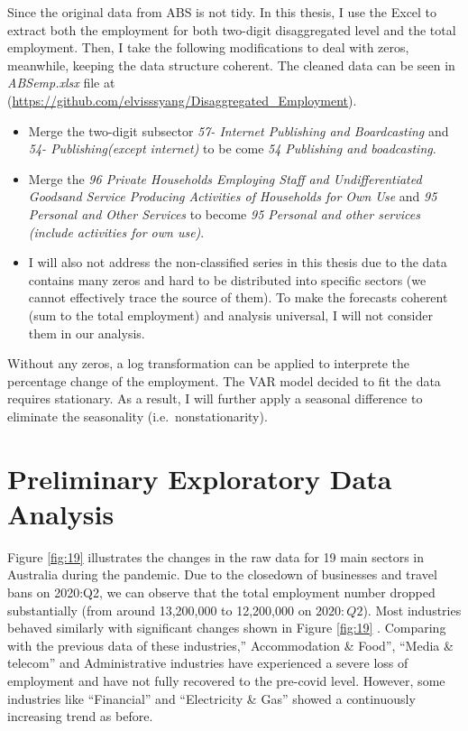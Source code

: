 \documentclass{monashthesis}
\begin{document}
Since the original data from ABS is not tidy. In this thesis, I use the Excel to extract both the employment for both two-digit disaggregated level and the total employment. Then, I take the following modifications to deal with zeros, meanwhile, keeping the data structure coherent. The cleaned data can be seen in \emph{ABSemp.xlsx} file at (\url{https://github.com/elvisssyang/Disaggregated_Employment}).

\begin{itemize}
\item
  Merge the two-digit subsector \emph{57- Internet Publishing and Boardcasting} and \emph{54- Publishing(except internet)} to be come \emph{54 Publishing and boadcasting}.
\item
  Merge the \emph{96 Private Households Employing Staff and Undifferentiated Goodsand Service Producing Activities of Households for Own Use} and \emph{95 Personal and Other Services} to become \emph{95 Personal and other services (include activities for own use)}.
\item
  I will also not address the non-classified series in this thesis due to the data contains many zeros and hard to be distributed into specific sectors (we cannot effectively trace the source of them). To make the forecasts coherent (sum to the total employment) and analysis universal, I will not consider them in our analysis.
\end{itemize}

Without any zeros, a log transformation can be applied to interprete the percentage change of the employment. The VAR model decided to fit the data requires stationary. As a result, I will further apply a seasonal difference to eliminate the seasonality (i.e.~nonstationarity).

\hypertarget{preliminary-exploratory-data-analysis}{%
\section{Preliminary Exploratory Data Analysis}\label{preliminary-exploratory-data-analysis}}

Figure \ref{fig:19} illustrates the changes in the raw data for 19 main sectors in Australia during the pandemic. Due to the closedown of businesses and travel bans on 2020:Q2, we can observe that the total employment number dropped substantially (from around 13,200,000 to 12,200,000 on \(2020:Q2\)). Most industries behaved similarly with significant changes shown in Figure \ref{fig:19} . Comparing with the previous data of these industries,'' Accommodation \& Food'', ``Media \& telecom'' and Administrative industries have experienced a severe loss of employment and have not fully recovered to the pre-covid level. However, some industries like ``Financial'' and ``Electricity \& Gas'' showed a continuously increasing trend as before.
\end{document}
